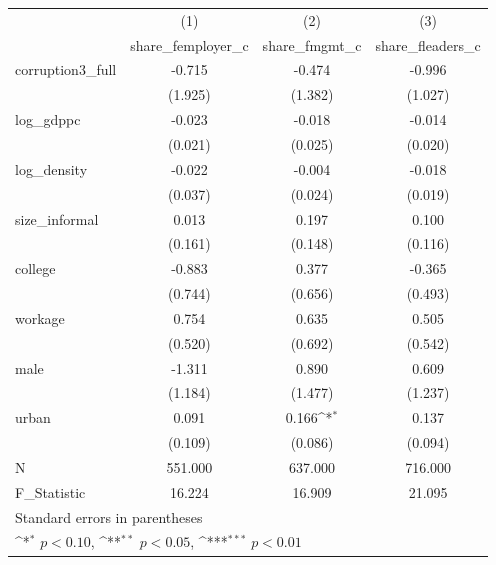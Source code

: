 {
\def\sym#1{\ifmmode^{#1}\else\(^{#1}\)\fi}
\begin{tabular}{l*{3}{c}}
\hline\hline
            &\multicolumn{1}{c}{(1)}&\multicolumn{1}{c}{(2)}&\multicolumn{1}{c}{(3)}\\
            &\multicolumn{1}{c}{share\_femployer\_c}&\multicolumn{1}{c}{share\_fmgmt\_c}&\multicolumn{1}{c}{share\_fleaders\_c}\\
\hline
corruption3\_full&      -0.715         &      -0.474         &      -0.996         \\
            &     (1.925)         &     (1.382)         &     (1.027)         \\
[1em]
log\_gdppc   &      -0.023         &      -0.018         &      -0.014         \\
            &     (0.021)         &     (0.025)         &     (0.020)         \\
[1em]
log\_density &      -0.022         &      -0.004         &      -0.018         \\
            &     (0.037)         &     (0.024)         &     (0.019)         \\
[1em]
size\_informal&       0.013         &       0.197         &       0.100         \\
            &     (0.161)         &     (0.148)         &     (0.116)         \\
[1em]
college     &      -0.883         &       0.377         &      -0.365         \\
            &     (0.744)         &     (0.656)         &     (0.493)         \\
[1em]
workage     &       0.754         &       0.635         &       0.505         \\
            &     (0.520)         &     (0.692)         &     (0.542)         \\
[1em]
male        &      -1.311         &       0.890         &       0.609         \\
            &     (1.184)         &     (1.477)         &     (1.237)         \\
[1em]
urban       &       0.091         &       0.166\sym{*}  &       0.137         \\
            &     (0.109)         &     (0.086)         &     (0.094)         \\
\hline
N           &     551.000         &     637.000         &     716.000         \\
F\_Statistic &      16.224         &      16.909         &      21.095         \\
\hline\hline
\multicolumn{4}{l}{\footnotesize Standard errors in parentheses}\\
\multicolumn{4}{l}{\footnotesize \sym{*} \(p<0.10\), \sym{**} \(p<0.05\), \sym{***} \(p<0.01\)}\\
\end{tabular}
}
